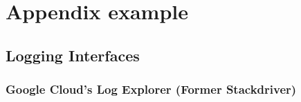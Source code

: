 \chapter{Appendix example}
\label{a1}

\section{Logging Interfaces}

\subsection{Google Cloud's Log Explorer (Former Stackdriver)}\label{a1:ss:google-cloud-log-explorer}

